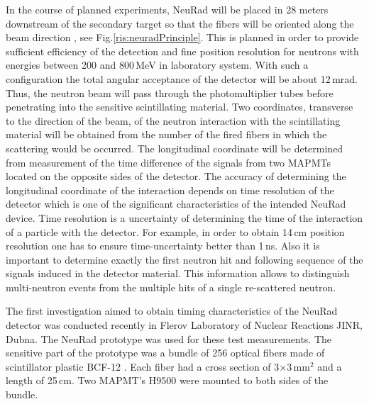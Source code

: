 \documentclass{webofc}
\begin{document}
In the course of planned experiments, NeuRad will be placed in 28 meters downstream of the secondary target so that the fibers will be oriented along the beam direction \cite{report}, see Fig.\ref{ris:neuradPrinciple}.
This is planned in order to provide sufficient efficiency of the detection and fine position resolution for neutrons with energies between 200 and 800\,MeV in laboratory system.
With such a configuration the total angular acceptance of the detector will be about 12\,mrad.
Thus, the neutron beam will pass through the photomultiplier tubes before penetrating into the sensitive scintillating material.
Two coordinates, transverse to the direction of the beam, of the neutron interaction with the scintillating material will be obtained from the number of the fired fibers in which the scattering would be occurred.
The longitudinal coordinate will be determined from measurement of the time difference of the signals from two MAPMTs located on the opposite sides of the detector. 
The accuracy of determining the longitudinal coordinate of the interaction depends on time resolution of the detector which is one of the significant characteristics of the intended NeuRad device.
Time resolution is a uncertainty of determining the time of the interaction of a particle with the detector.
For example, in order to obtain 14\,cm position resolution one has to ensure time-uncertainty better than 1\,ns.
Also it is important to determine exactly the first neutron hit and following sequence of the signals induced in the detector material. This information allows to distinguish multi-neutron events from the multiple hits of a single re-scattered neutron.


The first investigation aimed to obtain timing characteristics of the NeuRad detector was conducted recently in Flerov Laboratory of Nuclear Reactions JINR, Dubna. The NeuRad prototype was used for these test measurements. The sensitive part of the prototype was a bundle of 256 optical fibers made of scintillator plastic BCF-12 \cite{crystals}. 
Each fiber had a cross section of 3$\times$3\,mm$^2$ and a length of 25\,cm. Two MAPMT's H9500 \cite{hm} were mounted to both sides of the bundle.
\end{document}
